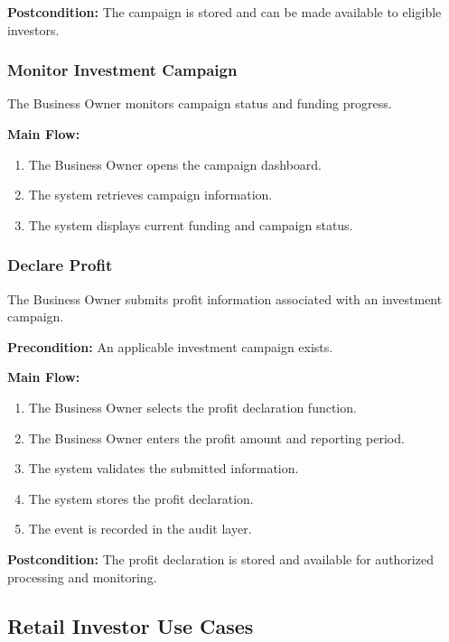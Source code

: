 \textbf{Postcondition:}
The campaign is stored and can be made available to eligible investors.


\subsubsection{Monitor Investment Campaign}

The Business Owner monitors campaign status and funding progress.

\textbf{Main Flow:}
\begin{enumerate}
    \item The Business Owner opens the campaign dashboard.
    \item The system retrieves campaign information.
    \item The system displays current funding and campaign status.
\end{enumerate}


\subsubsection{Declare Profit}

The Business Owner submits profit information associated with an investment
campaign.

\textbf{Precondition:}
An applicable investment campaign exists.

\textbf{Main Flow:}
\begin{enumerate}
    \item The Business Owner selects the profit declaration function.
    \item The Business Owner enters the profit amount and reporting period.
    \item The system validates the submitted information.
    \item The system stores the profit declaration.
    \item The event is recorded in the audit layer.
\end{enumerate}

\textbf{Postcondition:}
The profit declaration is stored and available for authorized processing
and monitoring.



\subsection{Retail Investor Use Cases}

